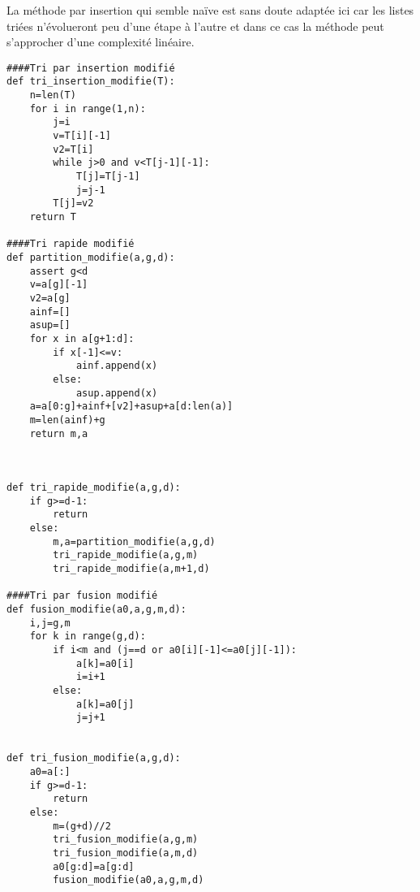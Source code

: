 

La méthode par insertion qui semble naïve est sans doute adaptée ici car les listes triées n'évolueront peu d'une étape à l'autre et dans ce cas la méthode peut s'approcher d'une complexité linéaire.



\begin{lstlisting}
####Tri par insertion modifié
def tri_insertion_modifie(T):
    n=len(T)
    for i in range(1,n):
        j=i
        v=T[i][-1]
        v2=T[i]
        while j>0 and v<T[j-1][-1]:
            T[j]=T[j-1]
            j=j-1
        T[j]=v2
    return T

####Tri rapide modifié
def partition_modifie(a,g,d):
    assert g<d
    v=a[g][-1]
    v2=a[g]
    ainf=[]
    asup=[]
    for x in a[g+1:d]:
        if x[-1]<=v:
            ainf.append(x)
        else:
            asup.append(x)
    a=a[0:g]+ainf+[v2]+asup+a[d:len(a)]
    m=len(ainf)+g
    return m,a



def tri_rapide_modifie(a,g,d):
    if g>=d-1:
        return
    else:
        m,a=partition_modifie(a,g,d)
        tri_rapide_modifie(a,g,m)
        tri_rapide_modifie(a,m+1,d)

####Tri par fusion modifié
def fusion_modifie(a0,a,g,m,d):
    i,j=g,m
    for k in range(g,d):
        if i<m and (j==d or a0[i][-1]<=a0[j][-1]):
            a[k]=a0[i]
            i=i+1
        else:
            a[k]=a0[j]
            j=j+1


def tri_fusion_modifie(a,g,d):
    a0=a[:]
    if g>=d-1:
        return
    else:
        m=(g+d)//2
        tri_fusion_modifie(a,g,m)
        tri_fusion_modifie(a,m,d)
        a0[g:d]=a[g:d]
        fusion_modifie(a0,a,g,m,d)

\end{lstlisting}





